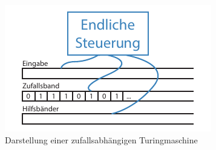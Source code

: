 \begin{figure}[h]
	\centering
	\includegraphics[width=.8\textwidth]{Graphics/Probabilistic_TM}	
	\caption{Darstellung einer zufallsabhängigen Turingmaschine}
	\label{fig:probabilistic_tm}
\end{figure}
